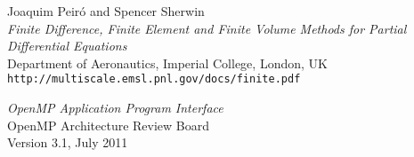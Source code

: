\documentclass[9pt,twocolumn]{scrartcl}
\begin{document}

\begin{thebibliography}{12345}

	Joaquim Peiró and Spencer Sherwin	\\
	\textit{Finite Difference, Finite Element and Finite Volume Methods for Partial Differential Equations}	\\
	Department of Aeronautics, Imperial College, London, UK	\\
	\texttt{\smaller http://multiscale.emsl.pnl.gov/docs/finite.pdf}

	\textit{OpenMP Application Program Interface}	\\
	OpenMP Architecture Review Board	\\
	Version 3.1, July 2011

\end{thebibliography}
\end{document}
